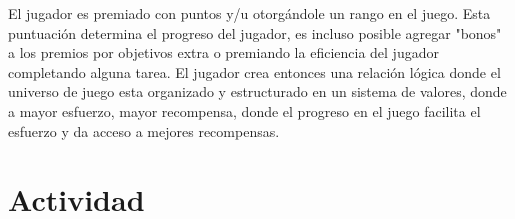 El jugador es premiado con puntos y/u otorgándole un rango en el juego. Esta puntuación determina el progreso del jugador, es incluso posible agregar "bonos" a los premios por objetivos extra o premiando la eficiencia del jugador completando alguna tarea. El jugador crea entonces una relación lógica donde el universo de juego esta organizado y estructurado en un sistema de valores, donde a mayor esfuerzo, mayor recompensa, donde el progreso en el juego facilita el esfuerzo y da acceso a mejores recompensas.
\section{Actividad}
